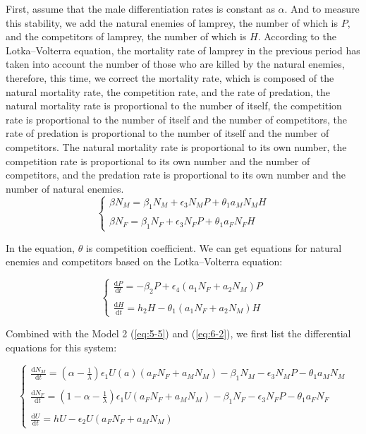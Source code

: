 \documentclass[12pt]{article}  %
\begin{document}
First, assume that the male differentiation rates is constant as $\alpha$. And to measure this stability, we add the natural enemies of lamprey, the number of which is $P$, and the competitors of lamprey, the number of which is $H$. According to the Lotka–Volterra equation, the mortality rate of lamprey in the previous period has taken into account the number of those who are killed by the natural enemies, therefore, this time, we correct the mortality rate, which is composed of the natural mortality rate, the competition rate, and the rate of predation, the natural mortality rate is proportional to the number of itself, the competition rate is proportional to the number of itself and the number of competitors, the rate of predation is proportional to the number of itself and the number of competitors. The natural mortality rate is proportional to its own number, the competition rate is proportional to its own number and the number of competitors, and the predation rate is proportional to its own number and the number of natural enemies.
\begin{equation}\label{eq:6-1}
\begin{cases}
	\beta N_{M} = \beta_{1}N_{M} + \epsilon_{3}N_{M}P + \theta_{1}a_{M}N_{M}H \\ \\
	\beta N_{F} = \beta_{1}N_{F} + \epsilon_{3}N_{F}P + \theta_{1}a_{F}N_{F}H
\end{cases}
\end{equation}

In the equation, $\theta$ is competition coefficient.
We can get equations for natural enemies and competitors based on the Lotka–Volterra equation:

\begin{equation}\label{eq:6-2}
\begin{cases}
	\frac{\mathrm{d}P}{\mathrm{d}t}=-\beta_{2}P + \epsilon_{4}(a_{1}N_{F}+a_{2}N_{M})P\\ \\
	\frac{\mathrm{d}H}{\mathrm{d}t}=h_{2}H-\theta_{1}(a_{1}N_{F}+a_{2}N_{M})H
\end{cases}
\end{equation}

Combined with the Model 2 (\ref{eq:5-5}) and (\ref{eq:6-2}), we first list the differential equations for this system:


\begin{equation}\label{eq:6-3}
\begin{cases}
	\frac{\mathrm{d}N_{M}}{\mathrm{d}t}=\left( \alpha - \frac{1}{\lambda} \right)\epsilon_{1}U(a)(a_{F}N_{F}+a_{M}N_{M})-\beta_{1}N_{M}-\epsilon_{3}N_{M}P-\theta_{1}a_{M}N_{M}\\
	\\
	\frac{\mathrm{d}N_{F}}{\mathrm{d}t}=\left( 1-\alpha-\frac{1}{\lambda}\right)\epsilon_{1}U(a_{F}N_{F}+a_{M}N_{M})-\beta_{1}N_{F}-\epsilon_{3}N_{F}P-\theta_{1}a_{F}N_{F}\\ \\
	\frac{\mathrm{d}U}{\mathrm{d}t}=hU-\epsilon_{2}U(a_{F}N_{F}+a_{M}N_{M})
\end{cases}
\end{equation}
\end{document}
